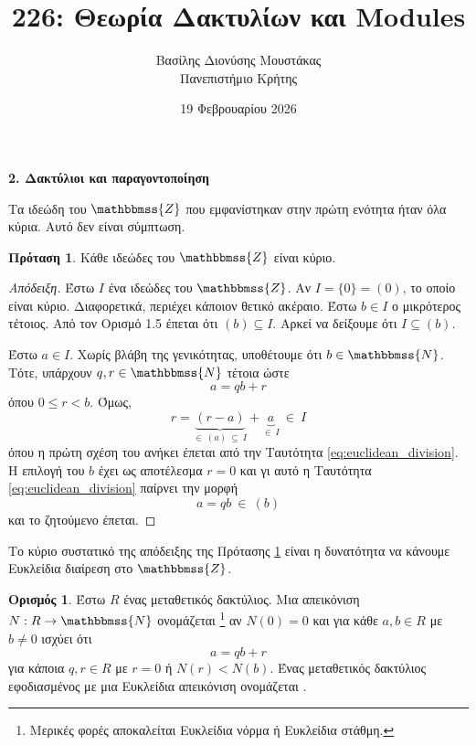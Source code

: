\documentclass[12pt,a4paper,reqno]{amsart}
\title{226: Θεωρία Δακτυλίων και Modules}
\author[Β.~Δ. Μουστακας]{Βασίλης Διονύσης Μουστάκας \\ Πανεπιστήμιο Κρήτης}
\date{19 Φεβρουαρίου 2026}
\theoremstyle{definition}
\newtheorem{proposition}[theorem]{Πρόταση}
\newtheorem{definition}[theorem]{Ορισμός}
\theoremstyle{remark}
\numberwithin{theorem}{section}
\numberwithin{exercise}{section}
\numberwithin{equation}{section}
\newcommand{\NN}{\mathbbmss{N}}
\newcommand{\ZZ}{\mathbbmss{Z}}
\renewcommand{\to}{\rightarrow}
\newcommand{\defn}[1]{{\color{mylightblue}{#1}}}
\begin{document}
\begingroup
\def\uppercasenonmath#1{} %
\let\MakeUppercase\relax %
\maketitle
\endgroup

\setcounter{section}{2}
\begin{center}
    \textbf{2. Δακτύλιοι και παραγοντοποίηση
} 
\end{center}

Τα ιδεώδη του $\ZZ$ που εμφανίστηκαν στην πρώτη ενότητα ήταν όλα κύρια. Αυτό δεν είναι σύμπτωση.
\begin{proposition}
    \label{prop:Z_implies_PID}
    Κάθε ιδεώδες του $\ZZ$ είναι κύριο.
\end{proposition}

\begin{proof}[Απόδειξη]
    Έστω $I$ ένα ιδεώδες του $\ZZ$. Αν $Ι = \{0\} = (0)$, το οποίο είναι κύριο. Διαφορετικά, περιέχει κάποιον θετικό ακέραιο. Έστω $b \in I$ ο μικρότερος τέτοιος. Από τον Ορισμό 1.5 έπεται ότι $(b) \subseteq I$. Αρκεί να δείξουμε ότι $I \subseteq (b)$.

    Έστω $a \in I$. Χωρίς βλάβη της γενικότητας, υποθέτουμε ότι $b \in \NN$. Τότε, υπάρχουν $q, r \in \NN$ τέτοια ώστε 
    \begin{equation}
    \label{eq:euclidean_division}
    a = qb + r
    \end{equation}
    όπου $0 \le r < b$. Όμως,
    \[
    r = \underbrace{\left(r-a\right)}_{\in \ (a) \ \subseteq \ I} + \underbrace{a}_{\in \ I} \ \in \ I
    \]
    όπου η πρώτη σχέση του ανήκει έπεται από την Ταυτότητα \eqref{eq:euclidean_division}. Η επιλογή του $b$ έχει ως αποτέλεσμα $r=0$ και γι αυτό η Ταυτότητα \eqref{eq:euclidean_division} παίρνει την μορφή 
    \[
    a = qb \ \in \ (b)
    \]
    και το ζητούμενο έπεται.
\end{proof}

Το κύριο συστατικό της απόδειξης της Πρότασης \ref{prop:Z_implies_PID} είναι η δυνατότητα να κάνουμε Ευκλείδια διαίρεση στο $\ZZ$.
\begin{definition}
    \label{def:euclidean_domain}
    Έστω $R$ ένας μεταθετικός δακτύλιος. Μια απεικόνιση $N : R \to \NN$ ονομάζεται \defn{Ευκλείδια}\footnote{Μερικές φορές αποκαλείται Ευκλείδια νόρμα ή Ευκλείδια στάθμη.} αν $N(0)=0$ και για κάθε $a, b \in R$ με $b \neq 0$ ισχύει ότι 
    \[
    a = qb + r
    \]
    για κάποια $q, r \in R$ με $r = 0$ ή $N(r) < N(b)$. Ένας μεταθετικός δακτύλιος εφοδιασμένος με μια Ευκλείδια απεικόνιση ονομάζεται \defn{Ευκλείδιος}.
\end{definition}
\end{document}

